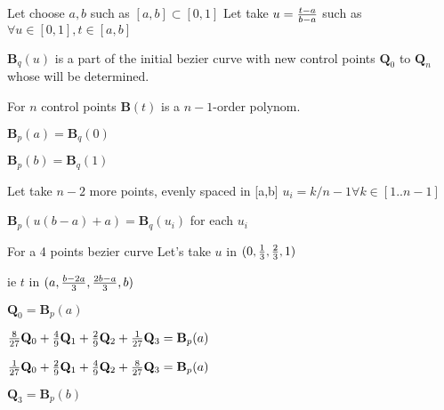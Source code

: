 \documentclass{article}
\providecommand{\PB}{\mathbf{B}}
\providecommand{\PQ}{\mathbf{Q}}
\begin{document}
Let choose $a,b$ such as $[a,b] \subset [0,1]$
Let take $u = {{t - a} \over {b - a}}$ such as $\forall u \in [0,1], t \in [a,b]$


$\PB_q(u)$ is a part of the initial bezier curve with new control points $\PQ_{0}$
to $\PQ_{n}$ whose  will be determined.

For $n$ control points $\PB(t)$ is a $n-1$-order polynom.

$\PB_p(a) = \PB_q(0)$

$\PB_p(b) = \PB_q(1)$

Let take $n-2$ more points, evenly spaced in [a,b]
$u_i = k / {n-1} \forall k \in [1 .. n-1]$

$\PB_p(u (b - a) + a) = \PB_q(u_i)$ for each $u_i$

For a 4 points bezier curve
Let's take $u$ in $(0, {1 \over 3}, {2 \over 3}, 1)$

ie $t$ in $(a, {{b - 2 a} \over {3}}, {{2b - a} \over {3}}, b)$

$ \PQ_0 = \PB_p(a) $

$ {8 \over 27} \PQ_0 + {4 \over 9 } \PQ_1 + {2 \over 9} \PQ_2 + {1 \over 27} \PQ_3 = \PB_p(a) $

$ {1 \over 27} \PQ_0 + {2 \over 9 } \PQ_1 + {4 \over 9} \PQ_2 + {8 \over 27} \PQ_3 = \PB_p(a) $

$ \PQ_3 = \PB_p(b) $

\end{document}
